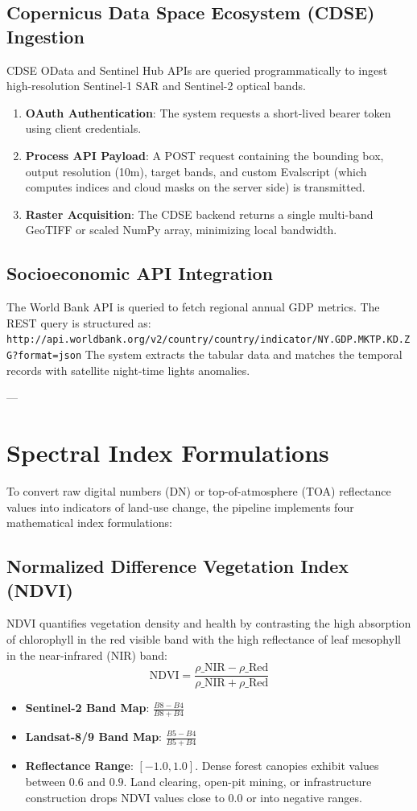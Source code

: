 \subsection{Copernicus Data Space Ecosystem (CDSE) Ingestion}
CDSE OData and Sentinel Hub APIs are queried programmatically to ingest high-resolution Sentinel-1 SAR and Sentinel-2 optical bands.
\begin{enumerate}
  \item \textbf{OAuth Authentication}: The system requests a short-lived bearer token using client credentials.
  \item \textbf{Process API Payload}: A POST request containing the bounding box, output resolution (10m), target bands, and custom Evalscript (which computes indices and cloud masks on the server side) is transmitted.
  \item \textbf{Raster Acquisition}: The CDSE backend returns a single multi-band GeoTIFF or scaled NumPy array, minimizing local bandwidth.

\end{enumerate}
\subsection{Socioeconomic API Integration}
The World Bank API is queried to fetch regional annual GDP metrics. The REST query is structured as:
\texttt{http://api.worldbank.org/v2/country/{country}/indicator/NY.GDP.MKTP.KD.ZG?format=json}
The system extracts the tabular data and matches the temporal records with satellite night-time lights anomalies.

---

\section{Spectral Index Formulations}
To convert raw digital numbers (DN) or top-of-atmosphere (TOA) reflectance values into indicators of land-use change, the pipeline implements four mathematical index formulations:

\subsection{Normalized Difference Vegetation Index (NDVI)}
NDVI quantifies vegetation density and health by contrasting the high absorption of chlorophyll in the red visible band with the high reflectance of leaf mesophyll in the near-infrared (NIR) band:
$$\text{NDVI} = \frac{\rho\_{\text{NIR}} - \rho\_{\text{Red}}}{\rho\_{\text{NIR}} + \rho\_{\text{Red}}}$$
\begin{itemize}
  \item \textbf{Sentinel-2 Band Map}: $\frac{B8 - B4}{B8 + B4}$
  \item \textbf{Landsat-8/9 Band Map}: $\frac{B5 - B4}{B5 + B4}$
  \item \textbf{Reflectance Range}: $[-1.0, 1.0]$. Dense forest canopies exhibit values between $0.6$ and $0.9$. Land clearing, open-pit mining, or infrastructure construction drops NDVI values close to $0.0$ or into negative ranges.

\end{itemize}
